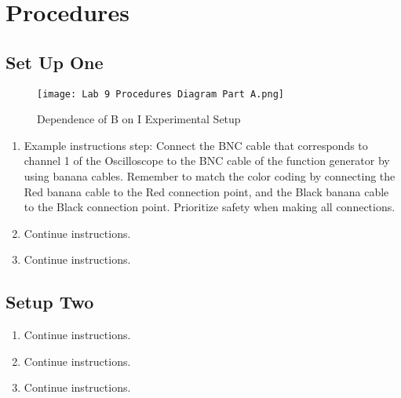 \documentclass[../Lab.tex]{subfiles}
\begin{document}
\section{Procedures}
\subsection{Set Up One}

 \begin{figure}[H] %
	\centering %
	\texttt{[image:  Lab 9 Procedures Diagram Part A.png]} %
	\caption{Dependence of B on I Experimental Setup}
\end{figure}

\begin{enumerate}[1)]
    \item Example instructions step: Connect the BNC cable that corresponds to channel 1 of the Oscilloscope to the BNC cable of the function generator by using banana cables. Remember to match the color coding by connecting the Red banana cable to the Red connection point, and the Black banana cable to the Black connection point. Prioritize safety when making all connections.
    \item Continue instructions.
    \item Continue instructions.
    
\end{enumerate}


\subsection{Setup Two}
\begin{enumerate}[1)]
    \item Continue instructions.
    \item Continue instructions.
    \item Continue instructions.
    
\end{enumerate}
\end{document}
